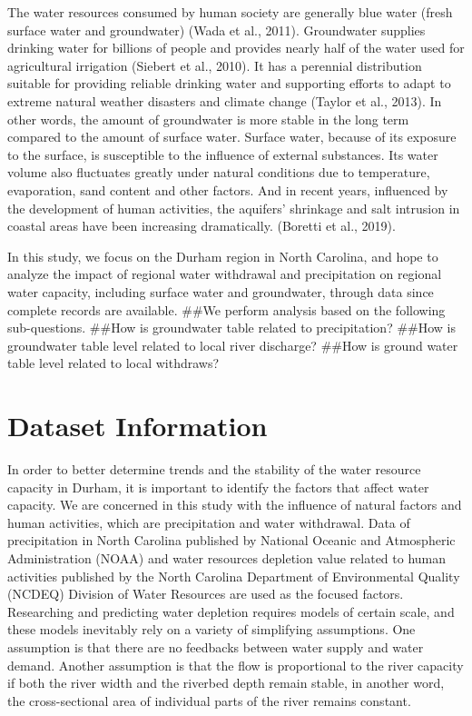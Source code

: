 \documentclass[
  12pt,
]{article}
\begin{document}
The water resources consumed by human society are generally blue water
(fresh surface water and groundwater) (Wada et al., 2011). Groundwater
supplies drinking water for billions of people and provides nearly half
of the water used for agricultural irrigation (Siebert et al., 2010). It
has a perennial distribution suitable for providing reliable drinking
water and supporting efforts to adapt to extreme natural weather
disasters and climate change (Taylor et al., 2013). In other words, the
amount of groundwater is more stable in the long term compared to the
amount of surface water. Surface water, because of its exposure to the
surface, is susceptible to the influence of external substances. Its
water volume also fluctuates greatly under natural conditions due to
temperature, evaporation, sand content and other factors. And in recent
years, influenced by the development of human activities, the aquifers'
shrinkage and salt intrusion in coastal areas have been increasing
dramatically. (Boretti et al., 2019).

In this study, we focus on the Durham region in North Carolina, and hope
to analyze the impact of regional water withdrawal and precipitation on
regional water capacity, including surface water and groundwater,
through data since complete records are available. \#\#We perform
analysis based on the following sub-questions. \#\#How is groundwater
table related to precipitation? \#\#How is groundwater table level
related to local river discharge? \#\#How is ground water table level
related to local withdraws?

\newpage

\hypertarget{dataset-information}{%
\section{Dataset Information}\label{dataset-information}}

In order to better determine trends and the stability of the water
resource capacity in Durham, it is important to identify the factors
that affect water capacity. We are concerned in this study with the
influence of natural factors and human activities, which are
precipitation and water withdrawal. Data of precipitation in North
Carolina published by National Oceanic and Atmospheric Administration
(NOAA) and water resources depletion value related to human activities
published by the North Carolina Department of Environmental Quality
(NCDEQ) Division of Water Resources are used as the focused factors.
Researching and predicting water depletion requires models of certain
scale, and these models inevitably rely on a variety of simplifying
assumptions. One assumption is that there are no feedbacks between water
supply and water demand. Another assumption is that the flow is
proportional to the river capacity if both the river width and the
riverbed depth remain stable, in another word, the cross-sectional area
of individual parts of the river remains constant.
\end{document}
